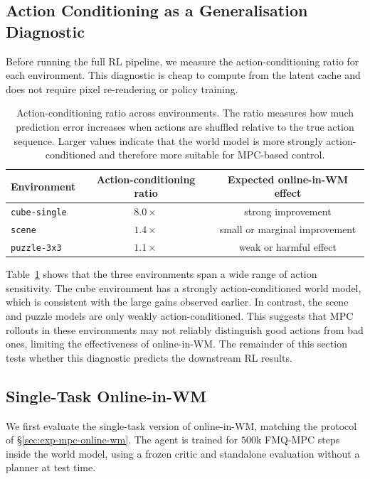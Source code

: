 \subsection{Action Conditioning as a Generalisation Diagnostic}
\label{sec:exp-gen-wm}

Before running the full RL pipeline, we measure the action-conditioning
ratio for each environment. This diagnostic is cheap to compute from
the latent cache and does not require pixel re-rendering or policy
training.

\begin{table}[h]
\centering
\caption{Action-conditioning ratio across environments. The ratio
measures how much prediction error increases when actions are shuffled
relative to the true action sequence. Larger values indicate that the
world model is more strongly action-conditioned and therefore more
suitable for MPC-based control.}
\label{tab:action-conditioning}
\begin{tabular}{lcc}
\toprule
Environment & Action-conditioning ratio & Expected online-in-WM effect \\
\midrule
\texttt{cube-single} & $8.0\times$ & strong improvement \\
\texttt{scene} & $1.4\times$ & small or marginal improvement \\
\texttt{puzzle-3x3} & $1.1\times$ & weak or harmful effect \\
\bottomrule
\end{tabular}
\end{table}

Table~\ref{tab:action-conditioning} shows that the three environments
span a wide range of action sensitivity. The cube environment has a
strongly action-conditioned world model, which is consistent with the
large gains observed earlier. In contrast, the scene and puzzle models
are only weakly action-conditioned. This suggests that MPC rollouts in
these environments may not reliably distinguish good actions from bad
ones, limiting the effectiveness of online-in-WM.
The remainder of this section tests whether this diagnostic predicts
the downstream RL results.

\subsection{Single-Task Online-in-WM}
\label{sec:exp-gen-single-task}

We first evaluate the single-task version of online-in-WM, matching the
protocol of \S\ref{sec:exp-mpc-online-wm}. The agent is trained for
$500$k FMQ-MPC steps inside the world model, using a frozen critic and
standalone evaluation without a planner at test time.

